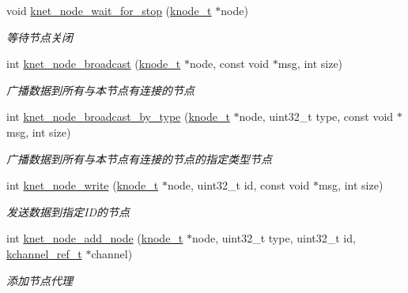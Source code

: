 \begin{DoxyCompactItemize}
void \hyperlink{a00135_ga0df83a5efbf28d8e8d08a46d084265d3_ga0df83a5efbf28d8e8d08a46d084265d3}{knet\+\_\+node\+\_\+wait\+\_\+for\+\_\+stop} (\hyperlink{a00066_a5e720b27efbc9ad744240f5f4233763a_a5e720b27efbc9ad744240f5f4233763a}{knode\+\_\+t} $\ast$node)
\begin{DoxyCompactList}\small\item\em 等待节点关闭 \end{DoxyCompactList}\item 
int \hyperlink{a00135_ga7960dad8d814bd4f07697e4484c57885_ga7960dad8d814bd4f07697e4484c57885}{knet\+\_\+node\+\_\+broadcast} (\hyperlink{a00066_a5e720b27efbc9ad744240f5f4233763a_a5e720b27efbc9ad744240f5f4233763a}{knode\+\_\+t} $\ast$node, const void $\ast$msg, int size)
\begin{DoxyCompactList}\small\item\em 广播数据到所有与本节点有连接的节点 \end{DoxyCompactList}\item 
int \hyperlink{a00135_gabf69af301870cd224020921ec5c310d9_gabf69af301870cd224020921ec5c310d9}{knet\+\_\+node\+\_\+broadcast\+\_\+by\+\_\+type} (\hyperlink{a00066_a5e720b27efbc9ad744240f5f4233763a_a5e720b27efbc9ad744240f5f4233763a}{knode\+\_\+t} $\ast$node, uint32\+\_\+t type, const void $\ast$msg, int size)
\begin{DoxyCompactList}\small\item\em 广播数据到所有与本节点有连接的节点的指定类型节点 \end{DoxyCompactList}\item 
int \hyperlink{a00135_ga5d8bef9ccbb5cc7807beeddb558345a9_ga5d8bef9ccbb5cc7807beeddb558345a9}{knet\+\_\+node\+\_\+write} (\hyperlink{a00066_a5e720b27efbc9ad744240f5f4233763a_a5e720b27efbc9ad744240f5f4233763a}{knode\+\_\+t} $\ast$node, uint32\+\_\+t id, const void $\ast$msg, int size)
\begin{DoxyCompactList}\small\item\em 发送数据到指定\+I\+D的节点 \end{DoxyCompactList}\item 
int \hyperlink{a00101_afa81e5a2fe15a15a3ee08696ebb9fb7f_afa81e5a2fe15a15a3ee08696ebb9fb7f}{knet\+\_\+node\+\_\+add\+\_\+node} (\hyperlink{a00066_a5e720b27efbc9ad744240f5f4233763a_a5e720b27efbc9ad744240f5f4233763a}{knode\+\_\+t} $\ast$node, uint32\+\_\+t type, uint32\+\_\+t id, \hyperlink{a00066_a3b7e82599367eade261456f60ebe2cd9_a3b7e82599367eade261456f60ebe2cd9}{kchannel\+\_\+ref\+\_\+t} $\ast$channel)
\begin{DoxyCompactList}\small\item\em 添加节点代理 \end{DoxyCompactList}\item 

\end{DoxyCompactItemize}
